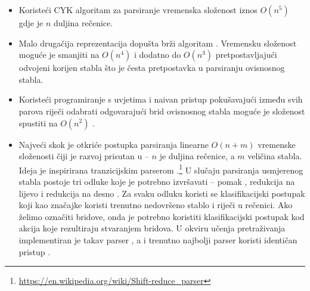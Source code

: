\begin{itemize}
  \item Koristeći CYK algoritam za parsiranje vremenska složenost iznos $O(n^5)$
  gdje je $n$ duljina rečenice.

  \item Malo drugačija reprezentacija dopušta brži algoritam
  \citep{eisner1999efficient}. Vremensku složenost moguće je smanjiti na
  $O(n^4)$ i dodatno do $O(n^3)$ pretpostavljajući odvojeni korijen 
  stabla što je česta pretpostavka u parsiranju ovisnosnog stabla.

  \item Koristeći programiranje s uvjetima  i
  naivan pristup pokušavajući između svih parova riječi odabrati odgovarajući
  brid ovisnosnog stabla moguće je složenost spustiti na $O(n^2)$
  \citep{covington2001fundamental}.

  \item Najveći skok je otkriće postupka parsiranja linearne $O(n + m)$
  vremenske složenosti čiji je razvoj prisutan u \citep{nivre03efficient,
  zhang2011transition, bohnet2012transition} -- $n$ je duljina rečenice, a $m$
  veličina stabla. Ideja je inspirirana tranzicijskim parserom .\footnote{\url{https://en.wikipedia.org/wiki/Shift-reduce_parser}} U
  slučaju parsiranja usmjerenog stabla postoje tri odluke koje je potrebno
  izvršavati -- pomak , redukcija na lijevo  i
  redukcija na desno . Za svaku odluku koristi se
  klasifikacijski postupak koji kao značajke koristi trenutno nedovršeno stablo
  i riječi u rečenici. Ako želimo označiti bridove, onda je potrebno koristiti
  klasifikacijski postupak kod akcija koje rezultiraju stvaranjem bridova. U
  okviru učenja pretraživanja implementiran je takav parser
  \citep{chang2015learning}, a i trenutno najbolji parser koristi identičan
  pristup \citep{andor2016globally}.

\end{itemize}

